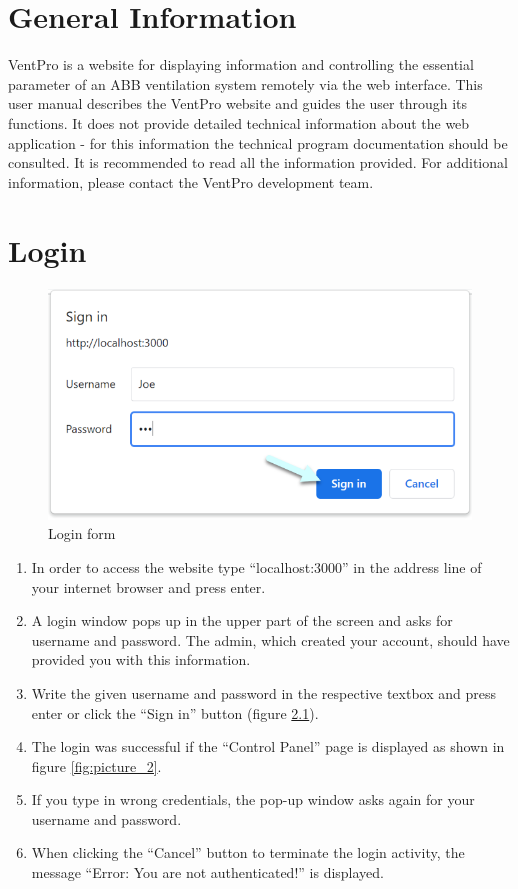 \chapter{General Information}
\label{sec:general_information}
VentPro is a website for displaying information and controlling the essential parameter of an ABB ventilation system remotely via the web interface.
This user manual describes the VentPro website and guides the user through its functions. It does not provide detailed technical information about the web application - for this information the technical program documentation should be consulted. It is recommended to read all the information provided. For additional information, please contact the VentPro development team.\\



\chapter{Login}
\label{sec:login}

\begin{figure}[h]
\centering
\includegraphics{img/Picture1}
\caption{Login form}
\label{fig:picture_1}
\end{figure}
\vspace{0.3cm}

\begin{enumerate}[wide,  labelwidth=0.3cm,  labelindent=0pt, leftmargin=0.5cm]
\item In order to access the website type “localhost:3000” in the address line of your internet browser and press enter.
\item A login window pops up in the upper part of the screen and asks for username and password. The admin, which created your account, should have provided you with this information.
\item Write the given username and password in the respective textbox and press enter or click the “Sign in” button (figure \ref{fig:picture_1}).
\item The login was successful if the “Control Panel” page is displayed as shown in figure \ref{fig:picture_2}.
\item If you type in wrong credentials, the pop-up window asks again for your username and password.
\item When clicking the “Cancel” button to terminate the login activity, the message “Error: You are not authenticated!” is displayed.
\end{enumerate}

